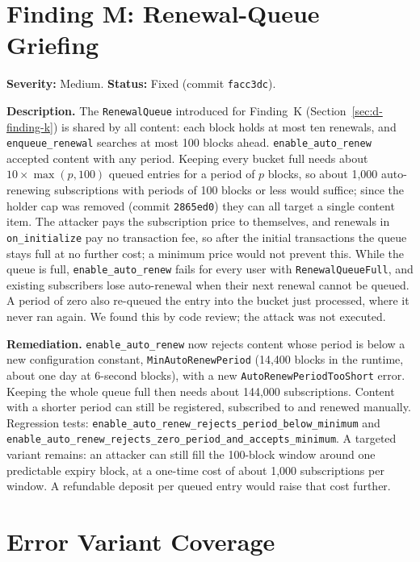 \section[Finding M: Renewal-Queue Griefing]{Finding M: Renewal-Queue Griefing}\label{sec:d-finding-m}

\textbf{Severity:} Medium. \textbf{Status:} Fixed (commit \texttt{facc3dc}).

\textbf{Description.} The \texttt{RenewalQueue} introduced for Finding~K (Section~\ref{sec:d-finding-k}) is shared by all content: each block holds at most ten renewals, and \texttt{enqueue\_renewal} searches at most 100 blocks ahead. \texttt{enable\_auto\_renew} accepted content with any period. Keeping every bucket full needs about $10 \times \max(p, 100)$ queued entries for a period of $p$ blocks, so about 1,000 auto-renewing subscriptions with periods of 100 blocks or less would suffice; since the holder cap was removed (commit \texttt{2865ed0}) they can all target a single content item. The attacker pays the subscription price to themselves, and renewals in \texttt{on\_initialize} pay no transaction fee, so after the initial transactions the queue stays full at no further cost; a minimum price would not prevent this. While the queue is full, \texttt{enable\_auto\_renew} fails for every user with \texttt{RenewalQueueFull}, and existing subscribers lose auto-renewal when their next renewal cannot be queued. A period of zero also re-queued the entry into the bucket just processed, where it never ran again. We found this by code review; the attack was not executed.

\textbf{Remediation.} \texttt{enable\_auto\_renew} now rejects content whose period is below a new configuration constant, \texttt{MinAutoRenewPeriod} (14,400 blocks in the runtime, about one day at 6-second blocks), with a new \texttt{AutoRenewPeriodTooShort} error. Keeping the whole queue full then needs about 144,000 subscriptions. Content with a shorter period can still be registered, subscribed to and renewed manually. Regression tests: \texttt{enable\_auto\_renew\_rejects\_\allowbreak period\_below\_minimum} and \texttt{enable\_auto\_renew\_rejects\_\allowbreak zero\_period\_\allowbreak and\_accepts\_minimum}. A targeted variant remains: an attacker can still fill the 100-block window around one predictable expiry block, at a one-time cost of about 1,000 subscriptions per window. A refundable deposit per queued entry would raise that cost further.

\section{Error Variant Coverage}\label{sec:d-coverage}

